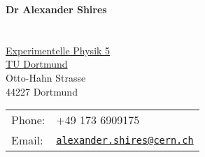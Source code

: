 \documentclass[10pt]{article}
\def\name{Dr Alexander Shires}
\providecommand*\email[1]{\href{mailto:#1}{#1}}
\renewcommand*\email[1]{\href{mailto:#1}{\texttt{#1}}}
\begin{document}

\centerline{\Large \bf \name}

\section*{\quad}

\begin{minipage}{0.50\linewidth}
  \href{http://www.e5.physik.uni-dortmund.de}{Experimentelle Physik 5} \\
  \href{http://www.uni-dortmund.de}{TU Dortmund} \\
  Otto-Hahn Strasse \\
  44227 Dortmund 
\end{minipage}
\begin{minipage}{0.50\linewidth}
  \begin{tabular}{ll}
    Phone: & +49 173 6909175 \\
    Email: & \email{alexander.shires@cern.ch}\\
  \end{tabular}
\end{minipage}

\end{document}

